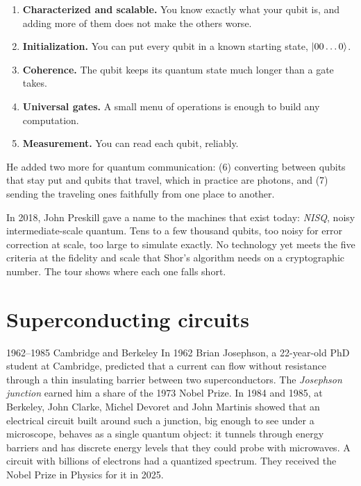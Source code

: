 \begin{enumerate}
\item \textbf{Characterized and scalable.} You know exactly what your qubit is, and
adding more of them does not make the others worse.
\item \textbf{Initialization.} You can put every qubit in a known starting state,
$\ket{00\dots0}$.
\item \textbf{Coherence.} The qubit keeps its quantum state much longer than a gate
takes.
\item \textbf{Universal gates.} A small menu of operations is enough to build any
computation.
\item \textbf{Measurement.} You can read each qubit, reliably.
\end{enumerate}

He added two more for quantum communication: (6) converting between qubits that
stay put and qubits that travel, which in practice are photons, and (7) sending the
traveling ones faithfully from one place to another.

In 2018, John Preskill gave a name to the machines that exist today: \emph{NISQ},
noisy intermediate-scale quantum. Tens to a few thousand qubits, too noisy for error
correction at scale, too large to simulate exactly. No technology yet meets the five
criteria at the fidelity and scale that Shor's algorithm needs on a cryptographic
number. The tour shows where each one falls short.

\section{Superconducting circuits}

\begin{history}{1962--1985 \textperiodcentered{} Cambridge and Berkeley}
In 1962 Brian Josephson, a 22-year-old PhD student at Cambridge, predicted that a
current can flow without resistance through a thin insulating barrier between two
superconductors. The \emph{Josephson junction} earned him a share of the 1973
Nobel Prize. In 1984 and 1985, at Berkeley, John Clarke, Michel Devoret and John
Martinis showed that an electrical circuit built around such a junction, big enough
to see under a microscope, behaves as a single quantum object: it tunnels through
energy barriers and has discrete energy levels that they could probe with
microwaves. A circuit with billions of electrons had a quantized spectrum. They
received the Nobel Prize in Physics for it in 2025.
\end{history}

